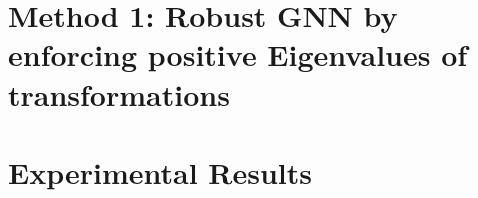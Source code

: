 \documentclass{article}
\theoremstyle{definition}
\begin{document}
\section{Method 1: Robust GNN by enforcing positive Eigenvalues of transformations}
\label{sec:positive_eigens}

% 

\section{Experimental Results}


%
\end{document}
